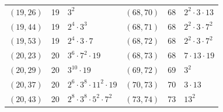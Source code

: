 \documentclass[11pt]{article}
\begin{document}
\begin{longtable}{@{}lrl@{\qquad}lrl@{}}
$(19,26)$ & 19 & $3^{2}$ & $(68,70)$ & 68 & $2^{2}\cdot 3\cdot 13$\\
$(19,44)$ & 19 & $2^{4}\cdot 3^{3}$ & $(68,71)$ & 68 & $2^{2}\cdot 3\cdot 7^{2}$\\
$(19,53)$ & 19 & $2^{4}\cdot 3\cdot 7$ & $(68,72)$ & 68 & $2^{2}\cdot 3\cdot 7^{2}$\\
$(20,23)$ & 20 & $3^{6}\cdot 7^{2}\cdot 19$ & $(68,73)$ & 68 & $7\cdot 13\cdot 19$\\
$(20,29)$ & 20 & $3^{10}\cdot 19$ & $(69,72)$ & 69 & $3^{2}$\\
$(20,37)$ & 20 & $2^{6}\cdot 3^{8}\cdot 11^{2}\cdot 19$ & $(70,73)$ & 70 & $3\cdot 13$\\
$(20,43)$ & 20 & $2^{8}\cdot 3^{8}\cdot 5^{2}\cdot 7^{2}$ & $(73,74)$ & 73 & $13^{2}$\\
\end{longtable}
\endgroup
\end{document}
